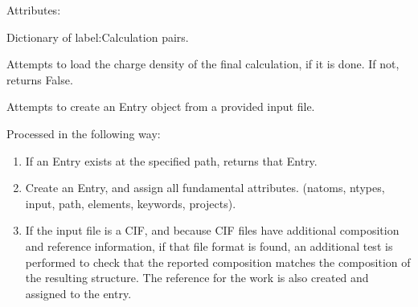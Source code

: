 \documentclass[letterpaper,10pt,english]{sphinxmanual}
\begin{document}
\begin{fulllineitems}
\begin{description}
\item[{Attributes:}] \leavevmode
{}

\end{description}

\begin{fulllineitems}
\label{models:qmpy.Entry.calculations}
Dictionary of label:Calculation pairs.

\end{fulllineitems}


\begin{fulllineitems}
\label{models:qmpy.Entry.chg}
Attempts to load the charge density of the final calculation, if it is
done. If not, returns False.

\end{fulllineitems}


\begin{fulllineitems}
\label{models:qmpy.Entry.create}
Attempts to create an Entry object from a provided input file.

Processed in the following way:
\begin{enumerate}
\item {} 
If an Entry exists at the specified path, returns that Entry.

\item {} 
Create an Entry, and assign all fundamental attributes. (natoms,
ntypes, input, path, elements, keywords, projects).

\item {} 
If the input file is a CIF, and because CIF files have additional 
composition and reference information, if that file format is 
found, an additional test is performed to check that the reported 
composition matches the composition of the resulting structure. The 
reference for the work is also created and assigned to the entry.


\end{enumerate}
\end{fulllineitems}
\end{fulllineitems}
\end{document}
